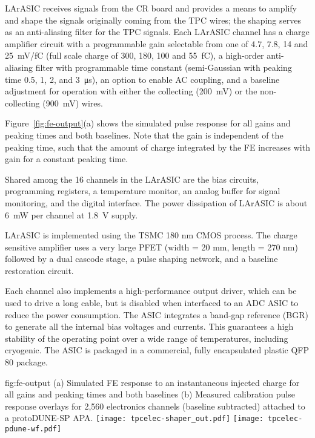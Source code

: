 
LArASIC receives signals from the CR board and
provides a means to amplify and shape the signals originally coming from the TPC wires; the
shaping serves as an anti-aliasing filter for the TPC signals.
Each LArASIC channel has a charge amplifier circuit with a programmable
gain selectable from one of 4.7, 7.8, 14 and 25~mV/fC
(full scale charge of 300, 180, 100 and 55~fC),
a high-order anti-aliasing filter with programmable time
constant (semi-Gaussian with peaking time 0.5, 1, 2, and 3~\si{\micro\second}),
an option to enable AC coupling,
and a baseline adjustment for operation with either the collecting (200~mV) or the non-collecting (900~mV) wires.

Figure~\ref{fig:fe-output}(a) shows the simulated pulse response for all gains and peaking times and both baselines.
Note that the gain is independent of the peaking time, such that the amount of charge integrated by the FE increases with gain for a constant peaking time.

Shared among the 16 channels in the LArASIC are the bias circuits, programming registers,
a temperature monitor, an analog buffer for signal monitoring, and the digital interface.
The power dissipation of LArASIC is about 6~mW per channel at 1.8~V supply.

LArASIC is implemented using the TSMC 180 nm CMOS process.  The charge sensitive amplifier uses a very large PFET (width = 20 mm, length = 270 nm) followed by a dual cascode stage, a pulse shaping network, and a baseline restoration circuit.  

Each channel also implements a high-performance output driver,
which can be used to drive a long cable, but is disabled when interfaced to an ADC ASIC to reduce the power consumption.
The ASIC integrates a band-gap reference (BGR) to generate all the internal bias voltages and currents.
This guarantees a high stability of the operating point over a wide range of
temperatures, including cryogenic.
The ASIC is packaged in a commercial, fully encapsulated plastic QFP 80 package.

\begin{dunefigure}
{fig:fe-output}
{(a) Simulated FE response to an instantaneous injected charge for all gains and peaking times and both baselines (b) Measured calibration pulse response overlays for 2,560 electronics channels (baseline subtracted) attached to a protoDUNE-SP APA. }
\texttt{[image: tpcelec-shaper\_out.pdf]}
\texttt{[image: tpcelec-pdune-wf.pdf]}
\end{dunefigure}

